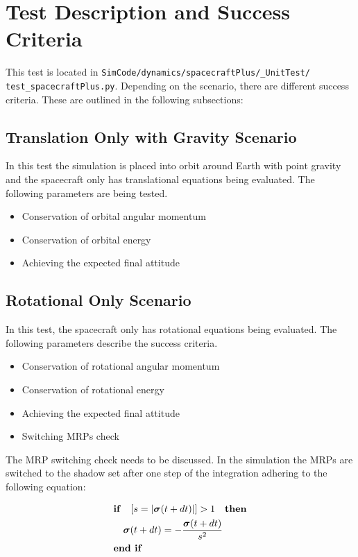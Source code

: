 \section{Test Description and Success Criteria}
This test is located in \texttt{SimCode/dynamics/spacecraftPlus/\_UnitTest/\newline
test\_spacecraftPlus.py}. Depending on the scenario, there are different success criteria. These are outlined in the following subsections:
\subsection{Translation Only with Gravity Scenario}
In this test the simulation is placed into orbit around Earth with point gravity and the spacecraft only has translational equations being evaluated. The following parameters are being tested. 
\begin{itemize}
	\item Conservation of orbital angular momentum
	\item Conservation of orbital energy
	\item Achieving the expected final attitude
\end{itemize}

\subsection{Rotational Only Scenario}
In this test, the spacecraft only has rotational equations being evaluated. The following parameters describe the success criteria.
\begin{itemize}
\item Conservation of rotational angular momentum
\item Conservation of rotational energy
\item Achieving the expected final attitude
\item Switching MRPs check
\end{itemize}

The MRP switching check needs to be discussed. In the simulation the MRPs are switched to the shadow set after one step of the integration adhering to the following equation\cite{schaub}:

\begin{equation}
\begin{gathered}
\begin{aligned}
&\textnormal{\textbf{if}}\quad [s = \vert \bm \sigma(t + dt) \vert ] > 1  \quad \textnormal{\textbf{then}}\\
&\quad \bm \sigma(t + dt) = - \frac{\bm \sigma(t + dt)}{s^2}\\
&\textnormal{\textbf{end if}}
\end{aligned}
\end{gathered}
\label{eq:ballin}
\end{equation}

